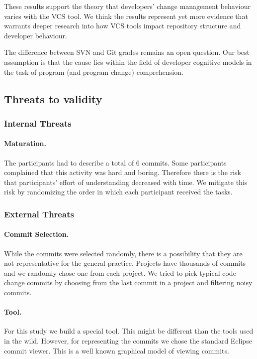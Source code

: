\documentclass[letterpaper]{article}
\begin{document}
These results support the theory that developers' change management behaviour varies with the VCS tool.
We think the results represent yet more evidence that warrants deeper research into how VCS tools impact repository structure and developer behaviour.

The difference  between SVN and Git grades remains an open question.
Our best assumption is that the cause lies within the field of developer cognitive models in the task of program (and program change) comprehension.

\subsection{Threats to validity}

\subsubsection{Internal Threats}

\paragraph{Maturation.}
The participants had to describe a total of 6 commits.
Some participants complained that this activity was hard and boring.
Therefore there is the risk that participants' effort of understanding decreased with time.
We mitigate this risk by randomizing the order in which each participant received the tasks.

\subsubsection{External Threats}

\paragraph{Commit Selection.}
While the commits were selected randomly, there is a possibility that they are not representative for the general practice.
Projects have thousands of commits and we randomly chose one from each project.
We tried to pick typical code change commits by choosing from the last commit in a project and filtering noisy commits.

\paragraph{Tool.}
For this study we build a special tool. 
This might be different than the tools used in the wild.
However, for representing the commits we chose the standard Eclipse commit viewer.
This is a well known graphical model of viewing commits.
\end{document}
